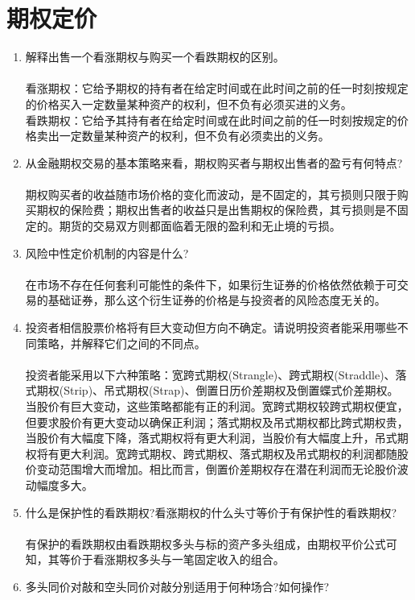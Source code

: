 \section{期权定价}
\begin{enumerate}
    \item 解释出售一个看涨期权与购买一个看跌期权的区别。\\
    \sol\\
    看涨期权：它给予期权的持有者在给定时间或在此时间之前的任一时刻按规定的价格买入一定数量某种资产的权利，但不负有必须买进的义务。\\
    看跌期权：它给予其持有者在给定时间或在此时间之前的任一时刻按规定的价格卖出一定数量某种资产的权利，但不负有必须卖出的义务。
    \item 从金融期权交易的基本策略来看，期权购买者与期权出售者的盈亏有何特点?\\
    \sol\\
    期权购买者的收益随市场价格的变化而波动，是不固定的，其亏损则只限于购买期权的保险费；期权出售者的收益只是出售期权的保险费，其亏损则是不固定的。期货的交易双方则都面临着无限的盈利和无止境的亏损。
    \item 风险中性定价机制的内容是什么?\\
    \sol\\
    在市场不存在任何套利可能性的条件下，如果衍生证券的价格依然依赖于可交易的基础证券，那么这个衍生证券的价格是与投资者的风险态度无关的。
    \item 投资者相信股票价格将有巨大变动但方向不确定。请说明投资者能采用哪些不同策略，并解释它们之间的不同点。\\
    \sol\\
    投资者能采用以下六种策略：宽跨式期权(Strangle)、跨式期权(Straddle)、落式期权(Strip)、吊式期权(Strap)、倒置日历价差期权及倒置蝶式价差期权。\\
    当股价有巨大变动，这些策略都能有正的利润。宽跨式期权较跨式期权便宜，但要求股价有更大变动以确保正利润；落式期权及吊式期权都比跨式期权贵，当股价有大幅度下降，落式期权将有更大利润，当股价有大幅度上升，吊式期权将有更大利润。宽跨式期权、跨式期权、落式期权及吊式期权的利润都随股价变动范围增大而增加。相比而言，倒置价差期权存在潜在利润而无论股价波动幅度多大。
    \item 什么是保护性的看跌期权?看涨期权的什么头寸等价于有保护性的看跌期权?\\
    \sol\\
    有保护的看跌期权由看跌期权多头与标的资产多头组成，由期权平价公式可知，其等价于看涨期权多头与一笔固定收入的组合。
    \item 多头同价对敲和空头同价对敲分别适用于何种场合?如何操作?\\

\end{enumerate}
